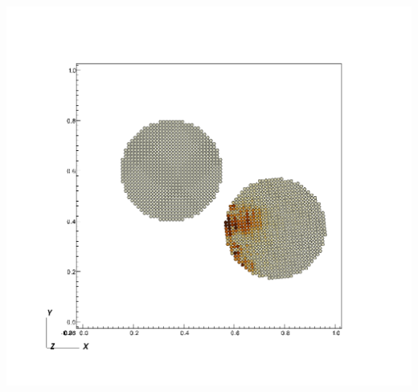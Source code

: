 \begin{minipage}[t]{0.3\textwidth}
  \centering
  \includegraphics[width=0.9\columnwidth]{FIGS/contact/specified2.png}
\end{minipage}

